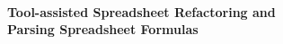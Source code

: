 

\thispagestyle{empty}
\onecolumn
{%
\sffamily
\centering

~\vspace{\fill}

{\huge \bfseries
Tool-assisted Spreadsheet Refactoring and \\ Parsing Spreadsheet Formulas\hspace{1.1mm}
}

\vspace{\fill}

}